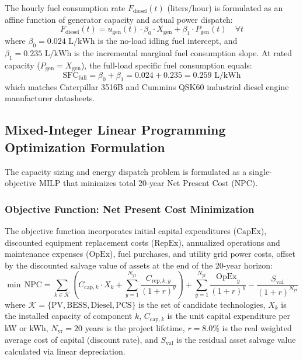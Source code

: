 \documentclass[11pt,a4paper]{article}
\begin{document}
The hourly fuel consumption rate $F_{\text{diesel}}(t)$ (liters/hour) is formulated as an affine function of generator capacity and actual power dispatch:
\begin{equation}
    F_{\text{diesel}}(t) = u_{\text{gen}}(t) \cdot \beta_0 \cdot X_{\text{gen}} + \beta_1 \cdot P_{\text{gen}}(t) \quad \forall t
    \label{eq:fuel_curve}
\end{equation}
where $\beta_0 = 0.024\text{ L/kWh}$ is the no-load idling fuel intercept, and $\beta_1 = 0.235\text{ L/kWh}$ is the incremental marginal fuel consumption slope. At rated capacity ($P_{\text{gen}} = X_{\text{gen}}$), the full-load specific fuel consumption equals:
\begin{equation}
    \text{SFC}_{\text{full}} = \beta_0 + \beta_1 = 0.024 + 0.235 = 0.259\text{ L/kWh}
    \label{eq:sfc}
\end{equation}
which matches Caterpillar 3516B and Cummins QSK60 industrial diesel engine manufacturer datasheets.

\subsection{Mixed-Integer Linear Programming Optimization Formulation}
\label{sec:milp_formulation}

The capacity sizing and energy dispatch problem is formulated as a single-objective MILP that minimizes total 20-year Net Present Cost ($\text{NPC}$).

\subsubsection{Objective Function: Net Present Cost Minimization}
The objective function incorporates initial capital expenditures ($\text{CapEx}$), discounted equipment replacement costs ($\text{RepEx}$), annualized operations and maintenance expenses ($\text{OpEx}$), fuel purchases, and utility grid power costs, offset by the discounted salvage value of assets at the end of the 20-year horizon:
\begin{equation}
    \min \, \text{NPC} = \sum_{k \in \mathcal{K}} \left( C_{\text{cap},k} \cdot X_k + \sum_{y=1}^{N_{\text{yr}}} \frac{C_{\text{rep},k,y}}{(1+r)^y} \right) + \sum_{y=1}^{N_{\text{yr}}} \frac{\text{OpEx}_y}{(1+r)^y} - \frac{S_{\text{val}}}{(1+r)^{N_{\text{yr}}}}
    \label{eq:objective}
\end{equation}
where $\mathcal{K} = \{\text{PV}, \text{BESS}, \text{Diesel}, \text{PCS}\}$ is the set of candidate technologies, $X_k$ is the installed capacity of component $k$, $C_{\text{cap},k}$ is the unit capital expenditure per kW or kWh, $N_{\text{yr}} = 20$ years is the project lifetime, $r = 8.0\%$ is the real weighted average cost of capital (discount rate), and $S_{\text{val}}$ is the residual asset salvage value calculated via linear depreciation.
\end{document}
